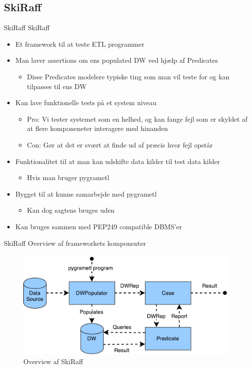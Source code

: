 \subsection{SkiRaff}

\begin{frame}{SkiRaff}{}
  SkiRaff
  \begin{itemize}
  \item<2-> Et framework til at teste ETL programmer
  \item<3-> Man laver assertions om ens populated DW ved hjælp af Predicates
    \begin{itemize}
      \item Disse Predicates modelere typiske ting som man vil teste for og kan tilpasses til ens DW
    \end{itemize}
  \item<4-> Kan lave funktionelle tests på et system niveau
    \begin{itemize}
    \item Pro: Vi tester systemet som en helhed, og kan fange fejl som er skyldet af at flere komponeneter interagere med hinanden
    \item Con: Gør at det er svært at finde ud af præcis hvor fejl opstår
    \end{itemize}
  \item<5-> Funktionalitet til at man kan udskifte data kilder til test data kilder
    \begin{itemize}
    \item Hvis man bruger pygrametl
    \end{itemize}
  \item<6-> Bygget til at kunne samarbejde med pygrametl
    \begin{itemize}
    \item Kan dog sagtens bruges uden
    \end{itemize}
  \item<7-> Kan bruges sammen med PEP249 compatible DBMS'er
  \end{itemize}
\end{frame}

\begin{frame}{SkiRaff}{}
  Overview af frameworkets komponenter
  \begin{figure}
    \centering
    \includegraphics[width=1\textwidth]{figures/overview.pdf}
    \caption{Overview af SkiRaff}
    \label{overview}
  \end{figure}
\end{frame}


